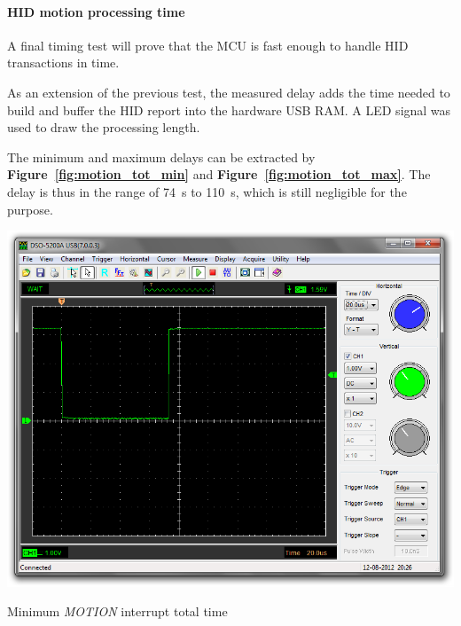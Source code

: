 \documentclass[a4paper,10pt]{article}
\makeatletter
\newenvironment{figurehere}{\def\@captype{figure}\vspace{2ex}}{\vspace{2ex}}
\newcommand{\citef}[1]{\textbf{Figure~\ref{#1}}}
\makeatother
\begin{document}
\begin{multicols}{2}
\paragraph{HID motion processing time}
A final timing test will prove that the MCU is fast enough to handle HID
transactions in time.

As an extension of the previous test, the measured delay adds the time needed
to build and buffer the HID report into the hardware USB RAM. A LED signal was
used to draw the processing length.

The minimum and maximum delays can be extracted by \citef{fig:motion_tot_min}
and \citef{fig:motion_tot_max}. The delay is thus in the range of 74~{\textmu}s
to 110~{\textmu}s, which is still negligible for the purpose.

\begin{figurehere}
	\centering
	\includegraphics[keepaspectratio=true,width=\columnwidth]{images/motion_tot_min.png}
	\caption{Minimum \emph{MOTION} interrupt total time}
	\label{fig:motion_tot_min}
\end{figurehere}


\end{multicols}
\end{document}
